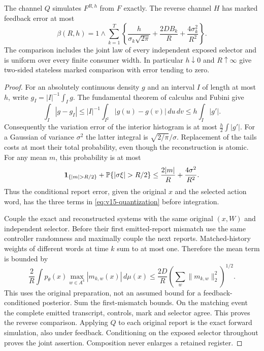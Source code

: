 \begin{lemma}\label{lem:v15-quantization}
The channel $Q$ simulates $F^{R,h}$ from $F$ exactly. The reverse
channel $H$ has marked feedback error at most
\begin{equation}\label{eq:v15-quantization}
 \beta(R,h)=1\wedge\sum_{k=1}^T
 \left\{\frac{h}{\sigma_k\sqrt{2\pi}}
       +\frac{2DB_k}{R}+\frac{4\sigma_k^2}{R^2}\right\}.
\end{equation}
The comparison includes the joint law of every independent exposed
selector and is uniform over every finite consumer width. In particular
$h\downarrow0$ and $R\uparrow\infty$ give two-sided stateless marked
comparison with error tending to zero.
\end{lemma}
\begin{proof}
For an absolutely continuous density $g$ and an interval $I$ of length
at most $h$, write $g_I=|I|^{-1}\int_Ig$. The fundamental theorem of
calculus and Fubini give
\[
 \int_I|g-g_I|\le |I|^{-1}\int_{I^2}|g(u)-g(v)|\,du\,dv
                  \le h\int_I|g'|.
\]
Consequently the variation error of the interior histogram is at most
$\frac h2\int|g'|$. For a Gaussian of variance $\sigma^2$ the latter
integral is $\sqrt{2/\pi}/\sigma$. Replacement of the tails costs at
most their total probability, even though the reconstruction is atomic.
For any mean $m$, this probability is at most
\[
 \1_{\{|m|>R/2\}}+\Pp\{|\sigma\xi|>R/2\}
 \le \frac{2|m|}{R}+\frac{4\sigma^2}{R^2}.
\]
Thus the conditional report error, given the original $x$ and the
selected action word, has the three terms in
\eqref{eq:v15-quantization} before integration.

Couple the exact and reconstructed systems with the same original
$(x,W)$ and independent selector. Before their first emitted-report
mismatch use the same controller randomness and maximally couple the
next reports. Matched-history weights of different words at time $k$
sum to at most one. Therefore the mean term is bounded by
\[
 \frac2R\int p_\theta(x)\max_{w\in A^k}|m_{k,w}(x)|\,d\mu(x)
 \le \frac{2D}{R}\left(\sum_w\|m_{k,w}\|_2^2\right)^{1/2}.
\]
This uses the original preparation, not an assumed bound for a
feedback-conditioned posterior. Sum the first-mismatch bounds.
On the matching event the complete emitted transcript, controls,
mark and selector agree. This proves the reverse comparison. Applying
$Q$ to each original report is the exact forward simulation, also
under feedback. Conditioning on the exposed selector throughout proves
the joint assertion. Composition never enlarges a retained register.
\end{proof}

